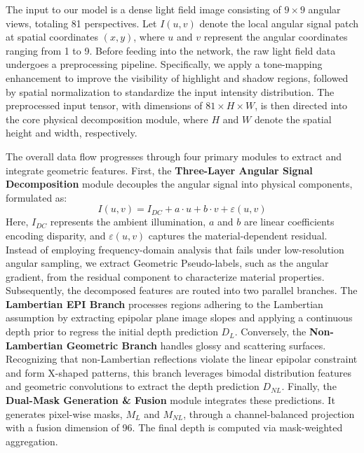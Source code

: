 \documentclass[lettersize,journal]{IEEEtran}
\begin{document}
The input to our model is a dense light field image consisting of $9 \times 9$ angular views, totaling 81 perspectives. Let $I(u,v)$ denote the local angular signal patch at spatial coordinates $(x,y)$, where $u$ and $v$ represent the angular coordinates ranging from 1 to 9. Before feeding into the network, the raw light field data undergoes a preprocessing pipeline. Specifically, we apply a tone-mapping enhancement to improve the visibility of highlight and shadow regions, followed by spatial normalization to standardize the input intensity distribution. The preprocessed input tensor, with dimensions of $81 \times H \times W$, is then directed into the core physical decomposition module, where $H$ and $W$ denote the spatial height and width, respectively.

The overall data flow progresses through four primary modules to extract and integrate geometric features. First, the \textbf{Three-Layer Angular Signal Decomposition} module decouples the angular signal into physical components, formulated as:
\begin{equation}
I(u,v) = I_{DC} + a \cdot u + b \cdot v + \varepsilon(u,v)
\label{eq:ch3_1}
\end{equation}
Here, $I_{DC}$ represents the ambient illumination, $a$ and $b$ are linear coefficients encoding disparity, and $\varepsilon(u,v)$ captures the material-dependent residual. Instead of employing frequency-domain analysis that fails under low-resolution angular sampling, we extract Geometric Pseudo-labels, such as the angular gradient, from the residual component to characterize material properties. Subsequently, the decomposed features are routed into two parallel branches. The \textbf{Lambertian EPI Branch} processes regions adhering to the Lambertian assumption by extracting epipolar plane image slopes and applying a continuous depth prior to regress the initial depth prediction $D_L$. Conversely, the \textbf{Non-Lambertian Geometric Branch} handles glossy and scattering surfaces. Recognizing that non-Lambertian reflections violate the linear epipolar constraint and form X-shaped patterns, this branch leverages bimodal distribution features and geometric convolutions to extract the depth prediction $D_{NL}$. Finally, the \textbf{Dual-Mask Generation \& Fusion} module integrates these predictions. It generates pixel-wise masks, $M_L$ and $M_{NL}$, through a channel-balanced projection with a fusion dimension of 96. The final depth is computed via mask-weighted aggregation.
\end{document}
